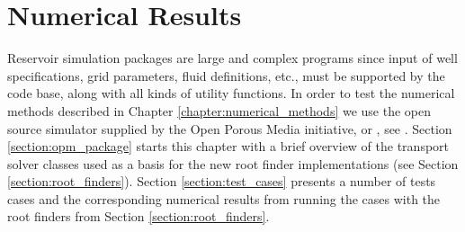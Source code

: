 \chapter{Numerical Results} \thispagestyle{chapterpage}
\label{chapter:numerical_results}


Reservoir simulation packages are large and complex programs since input of well specifications, grid parameters, fluid definitions, etc., must be supported by the code base, along with all kinds of utility functions. In order to test the numerical methods described in Chapter \ref{chapter:numerical_methods} we use the open source simulator supplied by the Open Porous Media initiative, or \opm, see \citet{opm_2014}. Section \ref{section:opm_package} starts this chapter with a brief overview of the \opm transport solver classes used as a basis for the new root finder implementations (see Section \ref{section:root_finders}). Section \ref{section:test_cases} presents a number of tests cases and the corresponding numerical results from running the cases with the root finders from Section \ref{section:root_finders}.

